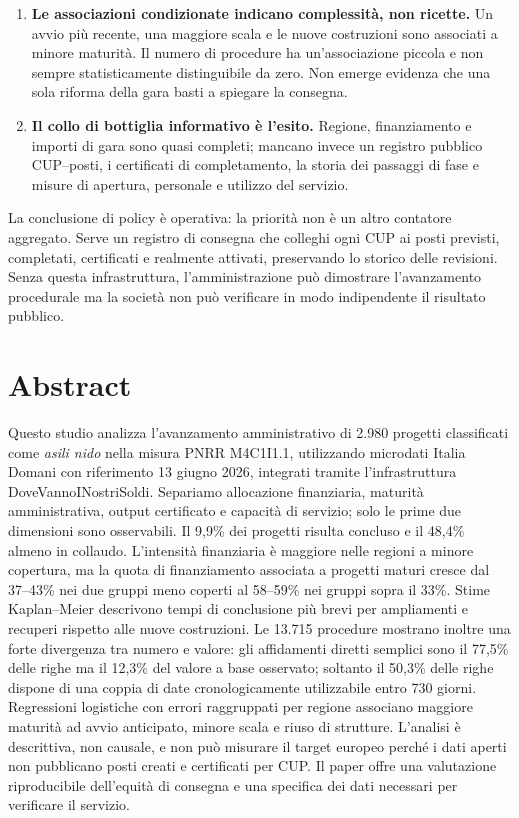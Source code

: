 \documentclass[10pt,a4paper]{article}
\begin{document}
\begin{enumerate}
  \item \textbf{Le associazioni condizionate indicano complessità, non ricette.} Un avvio più recente, una maggiore scala e le nuove costruzioni sono associati a minore maturità. Il numero di procedure ha un'associazione piccola e non sempre statisticamente distinguibile da zero. Non emerge evidenza che una sola riforma della gara basti a spiegare la consegna.
  \item \textbf{Il collo di bottiglia informativo è l'esito.} Regione, finanziamento e importi di gara sono quasi completi; mancano invece un registro pubblico CUP--posti, i certificati di completamento, la storia dei passaggi di fase e misure di apertura, personale e utilizzo del servizio.
\end{enumerate}

La conclusione di policy è operativa: la priorità non è un altro contatore aggregato. Serve un registro di consegna che colleghi ogni CUP ai posti previsti, completati, certificati e realmente attivati, preservando lo storico delle revisioni. Senza questa infrastruttura, l'amministrazione può dimostrare l'avanzamento procedurale ma la società non può verificare in modo indipendente il risultato pubblico.

\clearpage
\tableofcontents
\clearpage

\section*{Abstract}

Questo studio analizza l'avanzamento amministrativo di 2.980 progetti classificati come \emph{asili nido} nella misura PNRR M4C1I1.1, utilizzando microdati Italia Domani con riferimento 13 giugno 2026, integrati tramite l'infrastruttura DoveVannoINostriSoldi. Separiamo allocazione finanziaria, maturità amministrativa, output certificato e capacità di servizio; solo le prime due dimensioni sono osservabili. Il 9,9\% dei progetti risulta concluso e il 48,4\% almeno in collaudo. L'intensità finanziaria è maggiore nelle regioni a minore copertura, ma la quota di finanziamento associata a progetti maturi cresce dal 37--43\% nei due gruppi meno coperti al 58--59\% nei gruppi sopra il 33\%. Stime Kaplan--Meier descrivono tempi di conclusione più brevi per ampliamenti e recuperi rispetto alle nuove costruzioni. Le 13.715 procedure mostrano inoltre una forte divergenza tra numero e valore: gli affidamenti diretti semplici sono il 77,5\% delle righe ma il 12,3\% del valore a base osservato; soltanto il 50,3\% delle righe dispone di una coppia di date cronologicamente utilizzabile entro 730 giorni. Regressioni logistiche con errori raggruppati per regione associano maggiore maturità ad avvio anticipato, minore scala e riuso di strutture. L'analisi è descrittiva, non causale, e non può misurare il target europeo perché i dati aperti non pubblicano posti creati e certificati per CUP. Il paper offre una valutazione riproducibile dell'equità di consegna e una specifica dei dati necessari per verificare il servizio.
\end{document}
